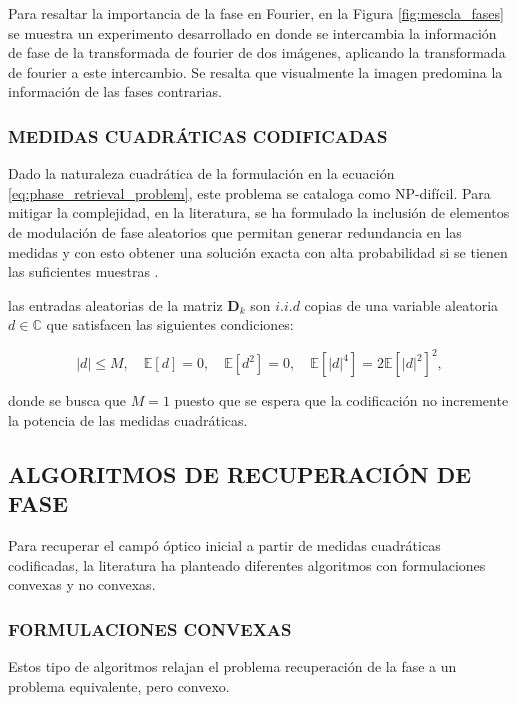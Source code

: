 Para resaltar la importancia de la fase en Fourier, en la Figura \ref{fig:mescla_fases} se muestra un experimento desarrollado en \cite{shechtman2015phase} donde se intercambia la información de fase de la transformada de fourier de dos imágenes, aplicando la transformada de fourier a este intercambio. Se resalta que visualmente la imagen predomina la información de las fases contrarias.

\subsubsection{MEDIDAS CUADRÁTICAS CODIFICADAS}
Dado la naturaleza cuadrática de la formulación en la ecuación \ref{eq:phase_retrieval_problem}, este problema se cataloga como NP-difícil. Para mitigar la complejidad, en la literatura, se ha formulado la inclusión de elementos de modulación de fase aleatorios que permitan generar redundancia en las medidas y con esto obtener una solución exacta con alta probabilidad si se tienen las suficientes muestras \cite{candes_CDP}.

las entradas aleatorias de la matriz  $\mathbf{D}_k$ son $i.i.d$ copias de una variable aleatoria $d \in \mathbb{C}$ que satisfacen las siguientes condiciones:

\begin{equation}
    \vert d \vert \leq M, \quad \mathbb{E}[d] = 0, \quad  \mathbb{E}[d^2] = 0, \quad  \mathbb{E}[\vert d \vert^4] = 2\mathbb{E}[\vert d \vert^2]^2,    
    \label{eq:restricciones_mascara}
\end{equation}

donde se busca que $M=1$ puesto que se espera que la codificación no incremente la potencia de las medidas cuadráticas.

\subsection{ALGORITMOS DE RECUPERACIÓN DE FASE}
Para recuperar el campó óptico inicial a partir de medidas cuadráticas codificadas, la literatura ha planteado diferentes algoritmos con formulaciones convexas y no convexas.

\subsubsection{FORMULACIONES CONVEXAS}

Estos tipo de algoritmos relajan el problema recuperación de la fase a un problema equivalente, pero convexo.

